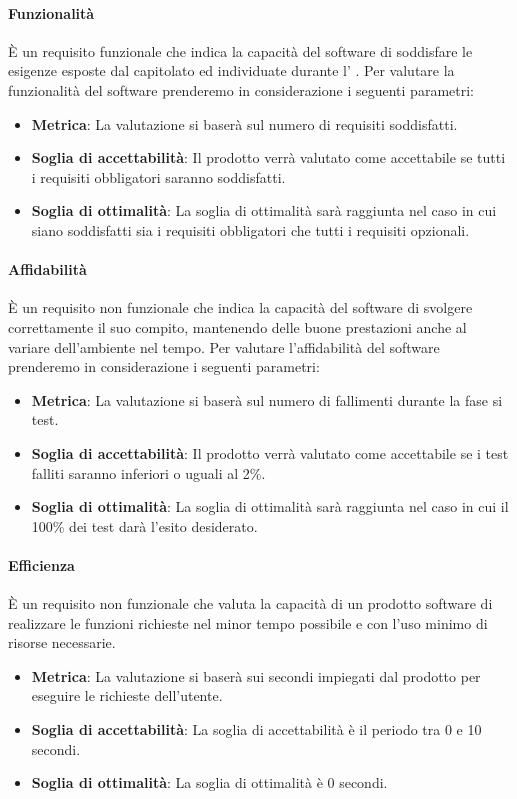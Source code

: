 \paragraph{Funzionalità}
È un requisito funzionale che indica la capacità del software di soddisfare le esigenze esposte dal capitolato ed individuate durante l’ \AdR .
Per valutare la funzionalità del software prenderemo in considerazione i seguenti parametri:
\begin{itemize}
	\item \textbf{Metrica}: La valutazione si baserà sul numero di requisiti soddisfatti.
	\item \textbf{Soglia di accettabilità}: Il prodotto verrà valutato come accettabile se tutti i requisiti obbligatori saranno soddisfatti.
	\item \textbf{Soglia di ottimalità}: La soglia di ottimalità sarà raggiunta nel caso in cui siano soddisfatti sia i requisiti obbligatori che tutti i requisiti opzionali.
\end{itemize}

\paragraph{Affidabilità}
È un requisito non funzionale che indica la capacità del software di svolgere correttamente il suo compito, mantenendo delle buone prestazioni anche al variare dell’ambiente nel tempo.
Per valutare l'affidabilità del software prenderemo in considerazione i seguenti parametri:
\begin{itemize}
	\item \textbf{Metrica}: La valutazione si baserà sul numero di fallimenti durante la fase si test.
	\item \textbf{Soglia di accettabilità}: Il prodotto verrà valutato come accettabile se i test falliti saranno inferiori o uguali al 2\%.
	\item \textbf{Soglia di ottimalità}: La soglia di ottimalità sarà raggiunta nel caso in cui il 100\% dei test darà l'esito desiderato.
\end{itemize}

\paragraph{Efficienza \color{red}{Oltre al tempo anche costo di ether???}}
È un requisito non funzionale che valuta la capacità di un prodotto software di realizzare le funzioni richieste nel minor tempo possibile e con l’uso minimo di risorse necessarie.
\begin{itemize}
	\item \textbf{Metrica}: La valutazione si baserà sui secondi impiegati dal prodotto per eseguire le richieste dell'utente.
	\item \textbf{Soglia di accettabilità}: La soglia di accettabilità è il periodo tra 0 e 10 secondi.
	\item \textbf{Soglia di ottimalità}: La soglia di ottimalità è 0 secondi.
\end{itemize}

